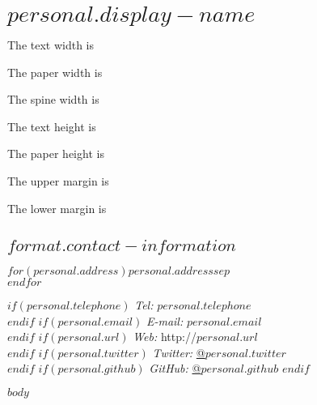 \documentclass[%
  $if(format.pdf-options.memoir-mode.papersize)$
    $format.pdf-options.memoir-mode.papersize$paper,
  $endif$
  $format.pdf-options.memoir-mode.typesize$,
  ]{memoir}
\date{$date$}
\newcommand\name{\textsc{$personal.display-name$}}
\newcommand\name{\textsc{$personal.display-name$}}
\begin{document}
  \section*{\textsc{\name}}
  The text width  is \the\textwidth

  The paper width  is \the\paperwidth

  The spine width  is \the\spinemargin


  The text height is \the\textheight

  The paper height is \the\paperheight

  The upper margin is \the\uppermargin

  The lower margin is \the\lowermargin

  \hypertarget{contact-information}{
  \subsection{$format.contact-information$}\label{contact-information}}
    \begin{minipage}[t]{0.3\textwidth}
      $for(personal.address)$$personal.address$$sep$\\ $endfor$
    \end{minipage}
    \begin{minipage}[t]{0.7\textwidth}
        $if(personal.telephone)$
        {\textit{Tel:}} $personal.telephone$ \\
        $endif$
        $if(personal.email)$
        {\textit{E-mail:}} $personal.email$ \\
        $endif$
        $if(personal.url)$
        {\textit{Web:}} http://$personal.url$ \\
        $endif$
        $if(personal.twitter)$
        {\textit{Twitter:}} \href{http://twitter.com/$personal.twitter$}{@$personal.twitter$} \\
        $endif$
        $if(personal.github)$
        {\textit{GitHub:}} \href{http://github.com/$personal.github$}{@$personal.github$}
        $endif$
    \end{minipage}
\vspace{-\baselineskip} %
$body$
\end{document}
